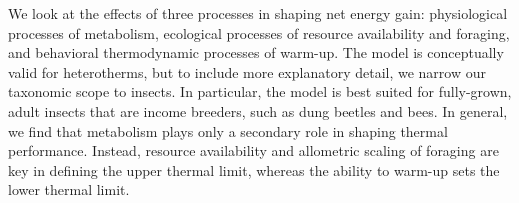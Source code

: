 We look at the effects of three processes in shaping net energy gain: physiological processes of metabolism, ecological processes of resource availability and foraging, and behavioral thermodynamic processes of warm-up.
The model is conceptually valid for heterotherms, but to include more explanatory detail, we narrow our taxonomic scope to insects.
In particular, the model is best suited for fully-grown, adult insects that are income breeders, such as dung beetles and bees.
In general, we find that metabolism plays only a secondary role in shaping thermal performance.
Instead, resource availability and allometric scaling of foraging are key in defining the upper thermal limit, whereas the ability to warm-up sets the lower thermal limit.
